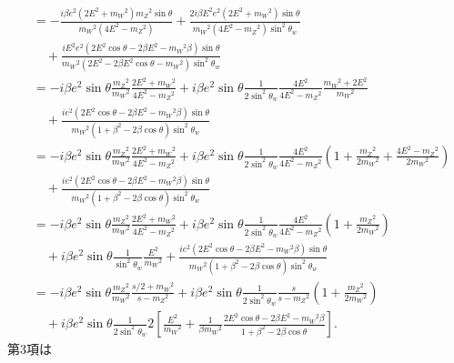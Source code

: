 \begin{align*}
  &= - \frac{i \beta e^2 \left(2 E^2 + m_W{}^2\right) m_Z{}^2 \sin\theta}{m_W{}^2 (4E^2 - m_Z{}^2)}
  + \frac{2 i \beta E^2 e^2 \left(2 E^2 + m_W{}^2\right) \sin\theta}{m_W{}^2 \left(4 E^2 - m_Z{}^2\right) \sin^2\theta_w} \\
  &\quad+ \frac{i E^2 e^2 \left(2 E^2 \cos\theta - 2 \beta E^2  - m_W{}^2 \beta \right) \sin\theta}{m_W{}^2 \left(2 E^2 - 2 \beta E^2 \cos\theta - m_W{}^2\right) \sin^2\theta_w} \\
  &= - i\beta e^2 \sin\theta \frac{m_Z{}^2}{m_W{}^2} \frac{2 E^2 + m_W{}^2}{4E^2 - m_Z{}^2}
  + i\beta e^2 \sin\theta \frac{1}{2\sin^2\theta_w} \frac{4E^2}{4E^2 - m_Z{}^2} \frac{m_W{}^2+2E^2}{m_W{}^2} \\
  &\quad+ \frac{i e^2 \left(2 E^2 \cos\theta - 2 \beta E^2  - m_W{}^2 \beta \right) \sin\theta}{m_W{}^2 \left(1 + \beta^2 - 2\beta\cos\theta\right) \sin^2\theta_w} \\
  &= - i\beta e^2 \sin\theta \frac{m_Z{}^2}{m_W{}^2} \frac{2 E^2 + m_W{}^2}{4E^2 - m_Z{}^2}
  + i\beta e^2 \sin\theta \frac{1}{2\sin^2\theta_w} \frac{4E^2}{4E^2 - m_Z{}^2} \left( 1 + \frac{m_Z{}^2}{2m_W{}^2} + \frac{4E^2-m_Z{}^2}{2m_W{}^2} \right) \\
  &\quad+ \frac{i e^2 \left(2 E^2 \cos\theta - 2 \beta E^2  - m_W{}^2 \beta \right) \sin\theta}{m_W{}^2 \left(1 + \beta^2 - 2\beta\cos\theta\right) \sin^2\theta_w} \\
  &= - i\beta e^2 \sin\theta \frac{m_Z{}^2}{m_W{}^2} \frac{2 E^2 + m_W{}^2}{4E^2 - m_Z{}^2}
  + i\beta e^2 \sin\theta \frac{1}{2\sin^2\theta_w} \frac{4E^2}{4E^2 - m_Z{}^2} \left( 1 + \frac{m_Z{}^2}{2m_W{}^2} \right) \\
  &\quad + i\beta e^2 \sin\theta \frac{1}{\sin^2\theta_w} \frac{E^2}{m_W{}^2}
  + \frac{i e^2 \left(2 E^2 \cos\theta - 2 \beta E^2  - m_W{}^2 \beta \right) \sin\theta}{m_W{}^2 \left(1 + \beta^2 - 2\beta\cos\theta\right) \sin^2\theta_w} \\
  &= - i\beta e^2 \sin\theta \frac{m_Z{}^2}{m_W{}^2} \frac{s/2 + m_W{}^2}{s - m_Z{}^2}
  + i\beta e^2 \sin\theta \frac{1}{2\sin^2\theta_w} \frac{s}{s - m_Z{}^2} \left( 1 + \frac{m_Z{}^2}{2m_W{}^2} \right) \\
  &\quad + i\beta e^2 \sin\theta \frac{1}{2\sin^2\theta_w}
  2 \left[ \frac{E^2}{m_W{}^2} + \frac{1}{\beta m_W{}^2} \frac{2 E^2 \cos\theta - 2 \beta E^2  - m_W{}^2 \beta}{1 + \beta^2 - 2\beta\cos\theta} \right] .
\end{align*}
第3項は
